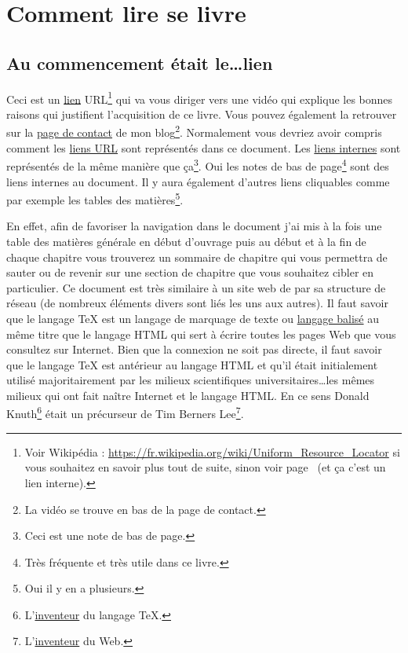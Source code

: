 \chapter{Comment lire se livre}\label{chap:howto}
\newpage
\minitoc
\newpage

\section{Au commencement était le\dots lien}\label{sec:link}

Ceci est un \href{https://youtu.be/K88qlGcd7Ek}{lien}
URL\footnote{Voir Wikipédia :
  \url{https://fr.wikipedia.org/wiki/Uniform_Resource_Locator} si vous
  souhaitez en savoir plus tout de suite, sinon voir
  page~\pageref{sec:side} (et ça c'est un lien interne).} qui va vous diriger vers une vidéo qui
explique les bonnes raisons qui justifient l'acquisition de ce
livre. Vous pouvez également la retrouver sur la \href{http://doyouspeakenglish.fr/contact/}{page de contact} de mon
blog\footnote{La vidéo se trouve en bas de la page de contact.}. Normalement vous
devriez avoir compris comment les
\href{https://fr.wikipedia.org/wiki/Uniform_Resource_Locator}{liens
  URL} sont représentés dans ce document. Les \hyperlink{linkin}{liens internes} \hypertarget{retour}{sont}\label{retour}
représentés de la même manière que ça\footnote{Ceci est une note de
  bas de page.}. Oui les notes de bas de page\footnote{Très fréquente
  et très utile dans ce livre.} sont des liens internes au
document. Il y aura également d'autres liens cliquables comme par
exemple les tables des matières\footnote{Oui il y en a plusieurs.}.

En effet, afin de favoriser la navigation dans le document j'ai mis à la
fois une table des matières générale en début d'ouvrage puis au début
et à la fin de chaque chapitre vous trouverez un sommaire de chapitre
qui vous permettra de sauter ou de revenir sur une section de
chapitre que vous souhaitez cibler en particulier. Ce document est
très similaire à un site web de par sa structure de réseau (de
nombreux éléments divers sont liés les uns aux autres). Il faut savoir
que le langage \TeX{} est un
langage de marquage de texte ou \underline{langage balisé} au même
titre que le langage HTML qui sert à écrire toutes les pages Web
que vous consultez sur Internet. Bien que la connexion ne soit pas
directe, il faut savoir que le langage \TeX{} est antérieur au langage
HTML et qu'il était initialement utilisé majoritairement par les
milieux scientifiques universitaires\dots les mêmes milieux qui ont
fait naître Internet et le langage HTML. En ce sens Donald
Knuth\footnote{L'\href{https://fr.wikipedia.org/wiki/Donald_Knuth}{inventeur} du langage \TeX{}.} était un précurseur de
Tim Berners Lee\footnote{L'\href{https://fr.wikipedia.org/wiki/Tim_Berners-Lee}{inventeur} du Web.}.

